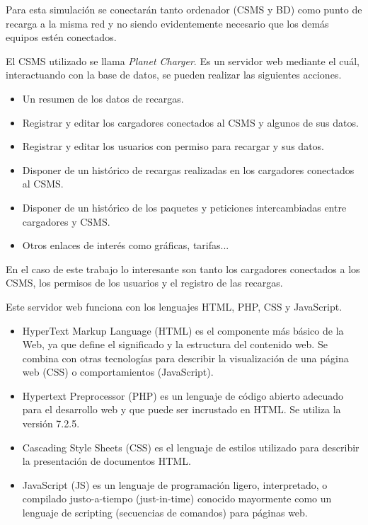 \documentclass[12pt,a4paper,onecolumn,oneside]{report}
\begin{document}
Para esta simulación se conectarán tanto ordenador (CSMS y BD) como punto de recarga a la misma red y no siendo evidentemente necesario que los demás equipos estén conectados.

El CSMS utilizado se llama \textit{Planet Charger}. Es un servidor web mediante el cuál, interactuando con la base de datos, se pueden realizar las siguientes acciones.

\begin{itemize} 
\item Un resumen de los datos de recargas.
\item Registrar y editar los cargadores conectados al CSMS y algunos de sus datos.
\item Registrar y editar los usuarios con permiso para recargar y sus datos.
\item Disponer de un histórico de recargas realizadas en los cargadores conectados al CSMS.
\item Disponer de un histórico de los paquetes y peticiones intercambiadas entre cargadores y CSMS.
\item Otros enlaces de interés como gráficas, tarifas...
\end{itemize}


En el caso de este trabajo lo interesante son tanto los cargadores conectados a los CSMS, los permisos de los usuarios y el registro de las recargas.

Este servidor web funciona con los lenguajes HTML, PHP, CSS y JavaScript.
\begin{itemize} 
\item HyperText Markup Language (HTML) es el componente más básico de la Web, ya que define el significado y la estructura del contenido web. Se combina con otras tecnologías para describir la visualización de una página web (CSS) o comportamientos (JavaScript).
\item Hypertext Preprocessor (PHP) es un lenguaje de código abierto adecuado para el desarrollo web y que puede ser incrustado en HTML. Se utiliza la versión 7.2.5.
\item Cascading Style Sheets (CSS) es el lenguaje de estilos utilizado para describir la presentación de documentos HTML.
\item JavaScript (JS) es un lenguaje de programación ligero, interpretado, o compilado justo-a-tiempo (just-in-time) conocido mayormente como un lenguaje de scripting (secuencias de comandos) para páginas web.
\end{itemize}
\end{document}
